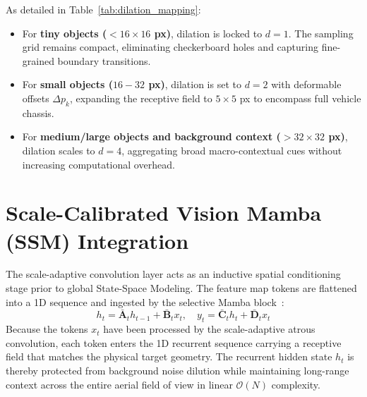 \documentclass[12pt,a4paper]{report}
\begin{document}
\begin{table}[htbp]
\centering
\caption{Scale-to-Dilation Rate and Receptive Field Mapping.}
\label{tab:dilation_mapping}
\end{table}

As detailed in Table~\ref{tab:dilation_mapping}:
\begin{itemize}
    \item For \textbf{tiny objects ($<16\times 16$ px)}, dilation is locked to $d=1$. The sampling grid remains compact, eliminating checkerboard holes and capturing fine-grained boundary transitions.
    \item For \textbf{small objects ($16 - 32$ px)}, dilation is set to $d=2$ with deformable offsets $\Delta p_k$, expanding the receptive field to $5 \times 5$ px to encompass full vehicle chassis.
    \item For \textbf{medium/large objects and background context ($>32\times 32$ px)}, dilation scales to $d=4$, aggregating broad macro-contextual cues without increasing computational overhead.
\end{itemize}

\section{Scale-Calibrated Vision Mamba (SSM) Integration}
The scale-adaptive convolution layer acts as an inductive spatial conditioning stage prior to global State-Space Modeling. The feature map tokens are flattened into a 1D sequence and ingested by the selective Mamba block~\cite{gu2023mamba,liu2024vmamba}:
\begin{equation}
    h_t = \mathbf{\bar{A}}_t h_{t-1} + \mathbf{\bar{B}}_t x_t, \quad y_t = \mathbf{\bar{C}}_t h_t + \mathbf{\bar{D}}_t x_t
\end{equation}
Because the tokens $x_t$ have been processed by the scale-adaptive atrous convolution, each token enters the 1D recurrent sequence carrying a receptive field that matches the physical target geometry. The recurrent hidden state $h_t$ is thereby protected from background noise dilution while maintaining long-range context across the entire aerial field of view in linear $\mathcal{O}(N)$ complexity.
\end{document}
